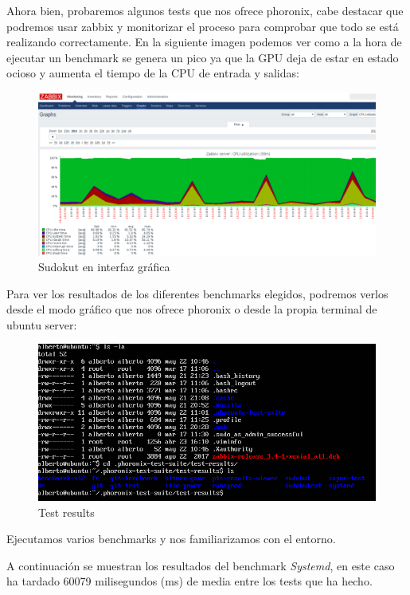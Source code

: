 \newpage
Ahora bien, probaremos algunos tests que nos ofrece phoronix, cabe destacar que podremos usar zabbix y monitorizar el proceso para comprobar que todo se está realizando correctamente. En la siguiente imagen podemos ver como a la hora de ejecutar un benchmark se genera un pico ya que la GPU deja de estar en estado ocioso y aumenta el tiempo de la CPU de entrada y salidas:

\begin{figure}[h]
	\centering
	\includegraphics[scale=0.25]{images/zabbix.png}
	\caption{Sudokut en interfaz gráfica}
\end{figure}

Para ver los resultados de los diferentes benchmarks elegidos, podremos verlos desde el modo gráfico que nos ofrece phoronix o desde la propia terminal de ubuntu server:


\begin{figure}[h]
	\centering
	\includegraphics[scale=0.40]{images/tests.png}
	\caption{Test results}
\end{figure}

\newpage

Ejecutamos varios benchmarks y nos familiarizamos con el entorno.

A continuación se muestran los resultados del benchmark \textit{Systemd}, en este caso ha tardado 60079 milisegundos (ms) de media entre los tests que ha hecho.


